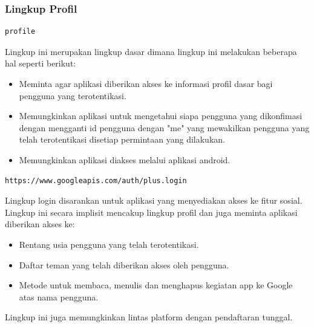 \subsubsection{Lingkup Profil}
\begin{lstlisting}
profile
\end{lstlisting}
Lingkup ini merupakan lingkup dasar dimana lingkup ini melakukan beberapa hal seperti berikut:
\begin{itemize}
\item
Meminta agar aplikasi diberikan akses ke informasi profil dasar bagi pengguna yang terotentikasi.
\item
Memungkinkan aplikasi untuk mengetahui siapa pengguna yang dikonfimasi dengan mengganti id pengguna dengan "me" yang mewakilkan pengguna yang telah terotentikasi disetiap permintaan yang dilakukan.
\item
Memungkinkan aplikasi diakses melalui aplikasi android.
\end{itemize}
\begin{lstlisting}
https://www.googleapis.com/auth/plus.login
\end{lstlisting}
Lingkup login disarankan untuk aplikasi yang menyediakan akses ke fitur sosial. Lingkup ini secara implisit mencakup lingkup profil dan juga meminta aplikasi diberikan akses ke:
\begin{itemize}
\item
Rentang usia pengguna yang telah terotentikasi.
\item
Daftar teman yang telah diberikan akses oleh pengguna.
\item
Metode untuk membaca, menulis dan menghapus kegiatan app ke Google atas nama pengguna.
\end{itemize}
Lingkup ini juga memungkinkan lintas platform dengan pendaftaran tunggal.

